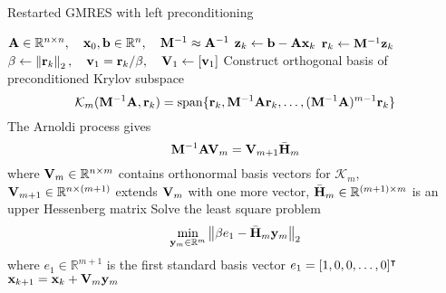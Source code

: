 \documentclass[12pt, titlepage]{article}
\begin{document}
\begin{algorithm}[H]
  \caption{Restarted GMRES with left preconditioning}
  \label{algo:gmres}
  \begin{algorithmic}[1]
    \State \(\mathbf{A} \in \mathbb{R}^{n \times n}, \quad \mathbf{x}_0, \mathbf{b} \in \mathbb{R}^n, \quad \mathbf{M}^{-1} \approx \mathbf{A}^{-1}\)
      \State \(\mathbf{z}_k \gets \mathbf{b} - \mathbf{A}\mathbf{x}_k\) 
      \State \(\mathbf{r}_k \gets \mathbf{M}^{-1}\mathbf{z}_k\) 
      \State \(\beta \gets \left\lVert\mathbf{r}_k\right\rVert_2, \quad \mathbf{v}_1 = \mathbf{r}_k / \beta, \quad \mathbf{V}_1 \gets [\mathbf{v}_1]\) 
      \State Construct orthogonal basis of preconditioned Krylov subspace \[\mathcal{K}_m(\mathbf{M}^{-1}\mathbf{A}, \mathbf{r}_k) = \mathrm{span}\{\mathbf{r}_k, \mathbf{M}^{-1}\mathbf{A}\mathbf{r}_k, \dots, (\mathbf{M}^{-1}\mathbf{A})^{m - 1}\mathbf{r}_k\}\]
      \State The Arnoldi process gives \[\mathbf{M}^{-1}\mathbf{A}\mathbf{V}_m = \mathbf{V}_{m+1}\bar{\mathbf{H}}_m\]
      where \(\mathbf{V}_m \in \mathbb{R}^{n \times m}\) contains orthonormal basis vectors for \(\mathcal{K}_m\),
      \(\mathbf{V}_{m+1} \in \mathbb{R}^{n \times (m+1)}\) extends \(\mathbf{V}_m\) with one more vector,
      \(\bar{\mathbf{H}}_m \in \mathbb{R}^{(m+1) \times m}\) is an upper Hessenberg matrix
      \State Solve the least square problem \[\min_{\mathbf{y}_m\in\mathbb{R}^m} \left\lVert\beta e_1 - \bar{\mathbf{H}}_m \mathbf{y}_m\right\rVert_2\]
      where \(e_1 \in \mathbb{R}^{m + 1}\) is the first standard basis vector \(e_1 = [1, 0, 0, \dots, 0]^\intercal\)
      \State \(\mathbf{x}_{k + 1} = \mathbf{x}_k + \mathbf{V}_m \mathbf{y}_m\) 
    \EndFor
  \end{algorithmic}
\end{algorithm}




 

\newpage

\printbibliography{}
\end{document}
